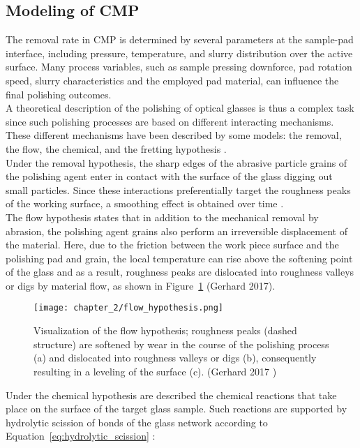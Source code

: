 \subsection{Modeling of CMP}
The removal rate in CMP is determined by several parameters at the sample-pad interface, including pressure, temperature, and slurry distribution over the active surface. Many process variables, such as sample pressing downforce, pad rotation speed, slurry characteristics and the employed pad material, can influence the final polishing outcomes.
\\
A theoretical description of the polishing of optical glasses is thus a complex task since such polishing processes are based on different interacting mechanisms. 
\\
These different mechanisms have been described by some models: the removal, the flow, the chemical, and the fretting hypothesis \cite{gerhardOpticsManufacturingComponents2017}.
\\
Under the removal hypothesis, the sharp edges of the abrasive particle grains of the polishing agent enter in contact with the surface of the glass digging out small particles. Since these interactions preferentially target the roughness peaks of the working surface, a smoothing effect is obtained over time \cite{gerhardOpticsManufacturingComponents2017}.
\\
The flow hypothesis states that in addition to the mechanical removal by abrasion, the polishing agent grains also perform an irreversible displacement of the material. Here, due to the friction between the work piece surface and the polishing pad and grain, the local temperature can rise above the softening point of the glass and as a result, roughness peaks are dislocated into roughness valleys or digs by material flow, as shown in Figure~\ref{fig:flow_hypothesis} (Gerhard 2017). 
\begin{figure}[H]
    \centering
    \texttt{[image: chapter\_2/flow\_hypothesis.png]}
    \caption[Visualization of the flow hypothesis.]{ Visualization of the flow hypothesis; roughness peaks (dashed structure) are softened by wear in the course of the polishing process (a) and dislocated into roughness valleys or digs (b), consequently resulting in a leveling of the surface (c). (Gerhard 2017 \cite{gerhardInvestigationNonuniformSurface2017})}
    \label{fig:flow_hypothesis}
\end{figure}
Under the chemical hypothesis are described the chemical reactions that take place on the surface of the target glass sample. Such reactions are supported by hydrolytic scission of bonds of the glass network according to Equation~\ref{eq:hydrolytic_scission} \cite{suratwalaChemistryFormationBeilby2015}:

